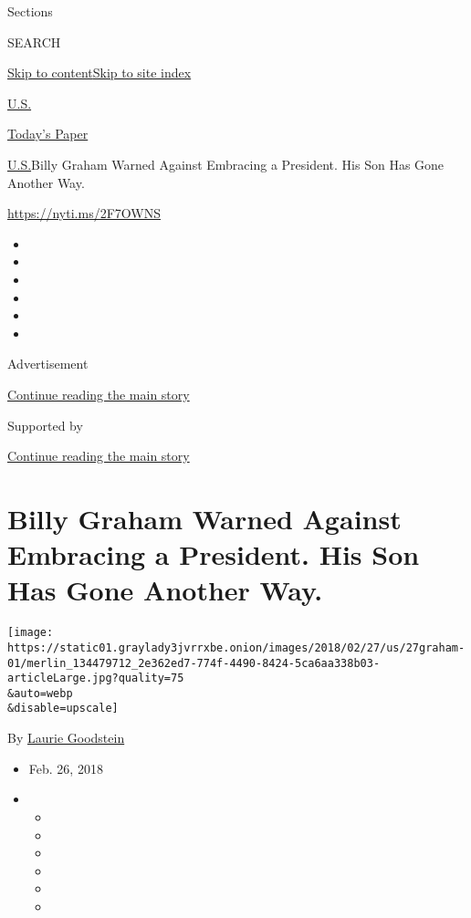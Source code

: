 Sections

SEARCH

\protect\hyperlink{site-content}{Skip to
content}\protect\hyperlink{site-index}{Skip to site index}

\href{https://www.nytimes3xbfgragh.onion/section/us}{U.S.}

\href{https://myaccount.nytimes3xbfgragh.onion/auth/login?response_type=cookie\&client_id=vi}{}

\href{https://www.nytimes3xbfgragh.onion/section/todayspaper}{Today's
Paper}

\href{/section/us}{U.S.}\textbar{}Billy Graham Warned Against Embracing
a President. His Son Has Gone Another Way.

\url{https://nyti.ms/2F7OWNS}

\begin{itemize}
\item
\item
\item
\item
\item
\item
\end{itemize}

Advertisement

\protect\hyperlink{after-top}{Continue reading the main story}

Supported by

\protect\hyperlink{after-sponsor}{Continue reading the main story}

\hypertarget{billy-graham-warned-against-embracing-a-president-his-son-has-gone-another-way}{%
\section{Billy Graham Warned Against Embracing a President. His Son Has
Gone Another
Way.}\label{billy-graham-warned-against-embracing-a-president-his-son-has-gone-another-way}}

\texttt{[image: https://static01.graylady3jvrrxbe.onion/images/2018/02/27/us/27graham-01/merlin\_134479712\_2e362ed7-774f-4490-8424-5ca6aa338b03-articleLarge.jpg?quality=75\\\&auto=webp\\\&disable=upscale]}

By \href{http://www.nytimes3xbfgragh.onion/by/laurie-goodstein}{Laurie
Goodstein}

\begin{itemize}
\item
  Feb. 26, 2018
\item
  \begin{itemize}
  \item
  \item
  \item
  \item
  \item
  \item
  \end{itemize}
\end{itemize}

